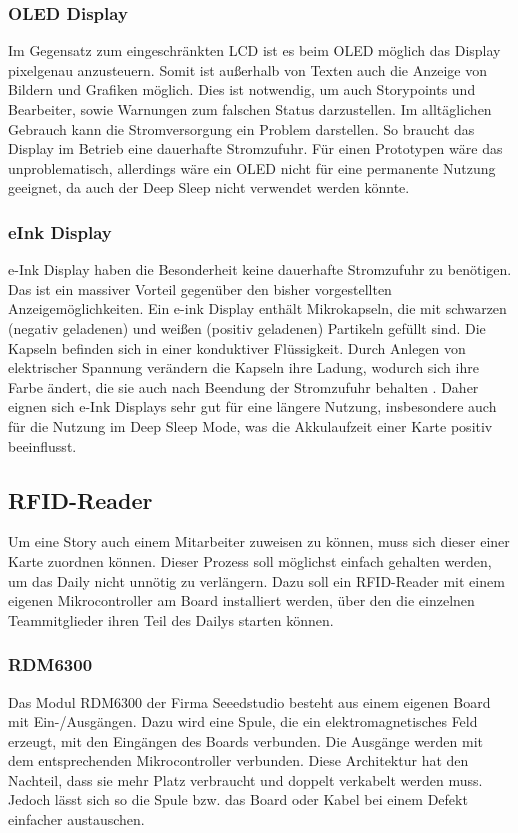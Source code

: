 \documentclass[12pt,titlepage]{scrartcl}
\begin{document}
			\subsubsection{OLED Display}
			Im Gegensatz zum eingeschränkten LCD ist es beim OLED möglich das Display pixelgenau anzusteuern. Somit ist außerhalb von Texten auch die Anzeige von Bildern und Grafiken möglich. Dies ist notwendig, um auch Storypoints und Bearbeiter, sowie Warnungen zum falschen Status darzustellen. Im alltäglichen Gebrauch kann die Stromversorgung ein Problem darstellen. So braucht das Display im Betrieb eine dauerhafte Stromzufuhr. Für einen Prototypen wäre das unproblematisch, allerdings wäre ein OLED nicht für eine permanente Nutzung geeignet, da auch der Deep Sleep nicht verwendet werden könnte.
			\subsubsection{eInk Display}
			e-Ink Display haben die Besonderheit keine dauerhafte Stromzufuhr zu benötigen. Das ist ein massiver Vorteil gegenüber den bisher vorgestellten Anzeigemöglichkeiten. Ein e-ink Display enthält Mikrokapseln, die mit schwarzen (negativ geladenen) und weißen (positiv geladenen) Partikeln gefüllt sind. Die Kapseln befinden sich in einer konduktiver Flüssigkeit. Durch Anlegen von elektrischer Spannung verändern die Kapseln ihre Ladung, wodurch sich ihre Farbe ändert, die sie auch nach Beendung der Stromzufuhr behalten \cite{einktech}.
Daher eignen sich e-Ink Displays sehr gut für eine längere Nutzung, insbesondere auch für die Nutzung im Deep Sleep Mode, was die Akkulaufzeit einer Karte positiv beeinflusst. 
		\subsection{RFID-Reader}
		Um eine Story auch einem Mitarbeiter zuweisen zu können, muss sich dieser einer Karte zuordnen können. Dieser Prozess soll möglichst einfach gehalten werden, um das Daily nicht unnötig zu verlängern. Dazu soll ein RFID-Reader mit einem eigenen Mikrocontroller am Board installiert werden, über den die einzelnen Teammitglieder ihren Teil des Dailys starten können.
			\subsubsection{RDM6300}
			Das Modul RDM6300 der Firma Seeedstudio besteht aus einem eigenen Board mit Ein-/Ausgängen. Dazu wird eine Spule, die ein elektromagnetisches Feld erzeugt, mit den Eingängen des Boards verbunden. Die Ausgänge werden mit dem entsprechenden Mikrocontroller verbunden. Diese Architektur hat den Nachteil, dass sie mehr Platz verbraucht und doppelt verkabelt werden muss. Jedoch lässt sich so die Spule bzw. das Board oder Kabel bei einem Defekt einfacher austauschen.
\end{document}
